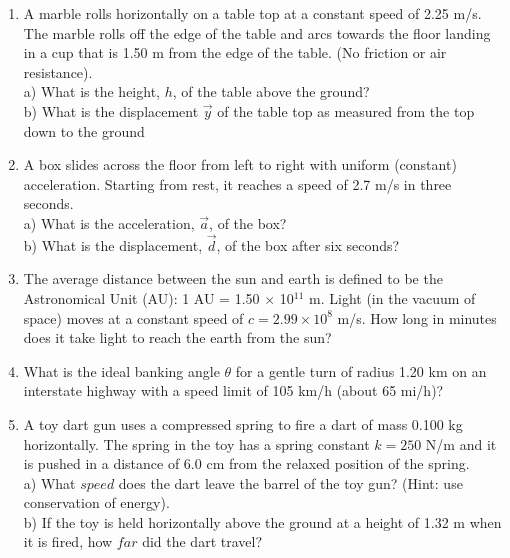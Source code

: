 \documentclass[12pt, a4paper/letterpaper]{report}
\begin{document}
\begin{enumerate}[leftmargin=\labelsep]
\item
A marble rolls horizontally on a table top at a constant speed of 2.25 m/s. The marble rolls off the edge of the table and arcs towards the floor landing in a cup that is 1.50 m from the edge of the table. (No friction or air resistance). \\a) What is the height, $h$, of the table above the ground?\\b) What is the displacement $\vec{y}$ of the table top as measured from the top down to the ground

\vspace{10mm}

\item
A box slides across the floor from left to right with uniform (constant) acceleration. Starting from rest, it reaches a speed of 2.7 m/s in three seconds. \\ a) What is the acceleration, $\vec{a}$, of the box? \\ b) What is the displacement, $\vec{d}$, of the box after six seconds?

\vspace{10mm}

\item
The average distance between the sun and earth is defined to be the Astronomical Unit (AU): 1 AU = 1.50 $\times$ 10$^{11}$ m. Light (in the vacuum of space) moves at a constant speed of $c = 2.99 \times 10^8$ m/s. How long in minutes does it take light to reach the earth from the sun?

\vspace{10mm}

\item
What is the ideal banking angle $\theta$ for a gentle turn of radius 1.20 km on an interstate highway with a speed limit of 105 km/h (about 65 mi/h)?

\vspace{10mm}

\item
A toy dart gun uses a compressed spring to fire a dart of mass 0.100 kg horizontally. The spring in the toy has a spring constant $k = 250$ N/m and it is pushed in a distance of 6.0 cm from the relaxed position of the spring. \\ a) What $speed$ does the dart leave the barrel of the toy gun? (Hint: use conservation of energy). \\ b) If the toy is held horizontally above the ground at a height of 1.32 m when it is fired, how $far$ did the dart travel?


\end{enumerate}
\end{document}
